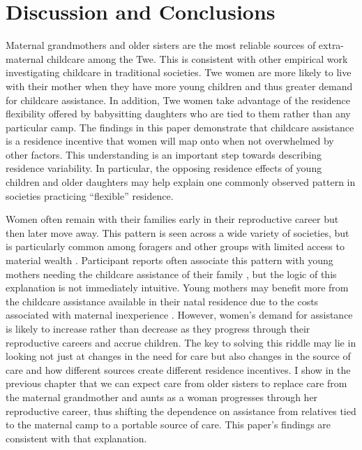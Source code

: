 \documentclass[10pt]{article}
\begin{document}
\section{Discussion and Conclusions}

Maternal grandmothers and older sisters are the most reliable sources of extra-maternal childcare among the Twe.  This is consistent with other empirical work investigating childcare in traditional societies.  Twe women are more likely to live with their mother when they have more young children and thus greater demand for childcare assistance.  In addition, Twe women take advantage of the residence flexibility offered by babysitting daughters who are tied to them rather than any particular camp.  The findings in this paper demonstrate that childcare assistance is a residence incentive that women will map onto when not overwhelmed by other factors.  This understanding is an important step towards describing residence variability.  In particular, the opposing residence effects of young children and older daughters may help explain one commonly observed pattern in societies practicing ``flexible'' residence.  

Women often remain with their families early in their reproductive career but then later move away.  This pattern is seen across a wide variety of societies, but is particularly common among foragers and other groups with limited access to material wealth \citep{marshall1959marriage, marlowe2004marital, hill2011co_sup}.  Participant reports often associate this pattern with young mothers needing the childcare assistance of their family \citep{lee1982politics}, but the logic of this explanation is not immediately intuitive.  Young mothers may benefit more from the childcare assistance available in their natal residence due to the costs associated with maternal inexperience \citep{hrdy2007evolutionary}.  However, women's demand for assistance is likely to increase rather than decrease as they progress through their reproductive careers and accrue children.  The key to solving this riddle may lie in looking not just at changes in the need for care but also changes in the source of care and how different sources create different residence incentives.  I show in the previous chapter that we can expect care from older sisters to replace care from the maternal grandmother and aunts as a woman progresses through her reproductive career, thus shifting the dependence on assistance from relatives tied to the maternal camp to a portable source of care.  This paper's findings are consistent with that explanation.
\end{document}
